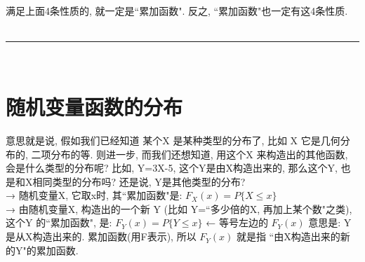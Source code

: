 \documentclass[UTF8]{ctexart}
\begin{document}
满足上面4条性质的, 就一定是``累加函数". 反之, ``累加函数"也一定有这4条性质. \\	
	
	
~\\
\hrule
~\\





\part{随机变量函数的分布}
	
	意思就是说, 假如我们已经知道 某个X 是某种类型的分布了, 比如 X 它是几何分布的, 二项分布的等. 则进一步, 而我们还想知道, 用这个X 来构造出的其他函数, 会是什么类型的分布呢? 比如, Y=3X-5,  这个Y是由X构造出来的, 那么这个Y, 也是和X相同类型的分布吗? 还是说, Y是其他类型的分布? \\
	
	→ 随机变量X, 它取x时, 其``累加函数"是: $\boxed{F_X (x)=P\{X \leq x\}}$ \\	
	
	→ 由随机变量X, 构造出的一个新 Y (比如 Y=``多少倍的X, 再加上某个数"之类), 这个Y 的``累加函数", 是: $\boxed{F_Y(x)=P\{Y \leq x\}}$  	← 等号左边的 $F_Y(x)$ 意思是: Y是从X构造出来的.  累加函数(用F表示), 所以 $F_Y(x)$ 就是指 ``由X构造出来的新的Y"的累加函数. \\
	
	
	
	
	
	
	
	
	
	
	
\end{document}
